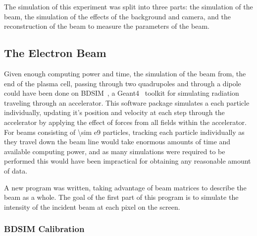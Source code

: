 The simulation of this experiment was split into three parts: the simulation of
the beam, the simulation of the effects of the background and camera, and the
reconstruction of the beam to measure the parameters of the beam.

\subsection{The Electron Beam}


Given enough computing power and time, the simulation of the beam from, the end
of the plasma cell, passing through two quadrupoles and through a dipole could
have been done on BDSIM~\cite{agapov2009bdsim}, a
Geant4~\cite{agostinelli2003geant4} toolkit for simulating radiation traveling
through an accelerator. This software package simulates a each particle
individually, updating it's position and velocity at each step through the
accelerator by applying the effect of forces from all fields within the
accelerator.  For beams consisting of \num{\sim e9} particles, tracking each
particle individually as they travel down the beam line would take enormous
amounts of time and available computing power, and as many simulations were
required to be performed this would have been impractical for obtaining any
reasonable amount of data.

A new program was written, taking advantage of beam matrices to describe the
beam as a whole. The goal of the first part of this program is to simulate the
intensity of the incident beam at each pixel on the screen.

\subsubsection{BDSIM Calibration}

